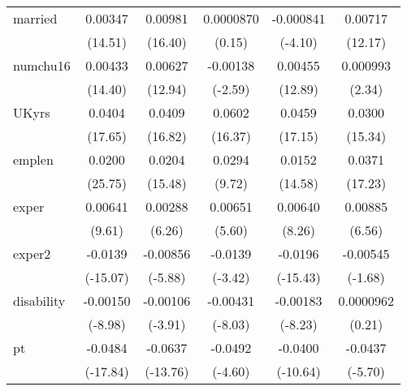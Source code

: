 \begin{table}[htbp]
\begin{tabular}{l*{5}{c}}
married     &     0.00347\sym{***}&     0.00981\sym{***}&   0.0000870         &   -0.000841\sym{***}&     0.00717\sym{***}\\
            &     (14.51)         &     (16.40)         &      (0.15)         &     (-4.10)         &     (12.17)         \\
numchu16    &     0.00433\sym{***}&     0.00627\sym{***}&    -0.00138\sym{**} &     0.00455\sym{***}&    0.000993\sym{*}  \\
            &     (14.40)         &     (12.94)         &     (-2.59)         &     (12.89)         &      (2.34)         \\
UKyrs       &      0.0404\sym{***}&      0.0409\sym{***}&      0.0602\sym{***}&      0.0459\sym{***}&      0.0300\sym{***}\\
            &     (17.65)         &     (16.82)         &     (16.37)         &     (17.15)         &     (15.34)         \\
emplen      &      0.0200\sym{***}&      0.0204\sym{***}&      0.0294\sym{***}&      0.0152\sym{***}&      0.0371\sym{***}\\
            &     (25.75)         &     (15.48)         &      (9.72)         &     (14.58)         &     (17.23)         \\
exper       &     0.00641\sym{***}&     0.00288\sym{***}&     0.00651\sym{***}&     0.00640\sym{***}&     0.00885\sym{***}\\
            &      (9.61)         &      (6.26)         &      (5.60)         &      (8.26)         &      (6.56)         \\
exper2      &     -0.0139\sym{***}&    -0.00856\sym{***}&     -0.0139\sym{***}&     -0.0196\sym{***}&    -0.00545         \\
            &    (-15.07)         &     (-5.88)         &     (-3.42)         &    (-15.43)         &     (-1.68)         \\
disability  &    -0.00150\sym{***}&    -0.00106\sym{***}&    -0.00431\sym{***}&    -0.00183\sym{***}&   0.0000962         \\
            &     (-8.98)         &     (-3.91)         &     (-8.03)         &     (-8.23)         &      (0.21)         \\
pt          &     -0.0484\sym{***}&     -0.0637\sym{***}&     -0.0492\sym{***}&     -0.0400\sym{***}&     -0.0437\sym{***}\\
            &    (-17.84)         &    (-13.76)         &     (-4.60)         &    (-10.64)         &     (-5.70)         \\

\end{tabular}
\end{table}
